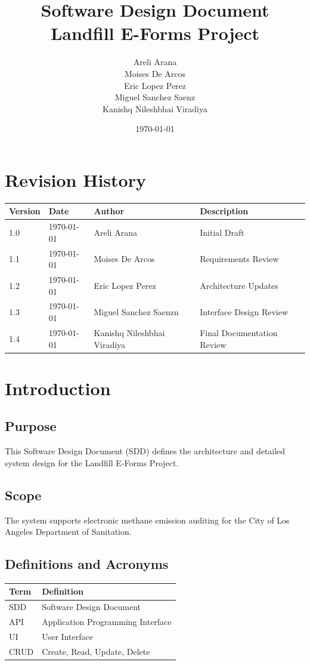 \documentclass[12pt]{article}
\title{Software Design Document\\
Landfill E-Forms Project}
\author{
Areli Arana \\
Moises De Arcos \\
Eric Lopez Perez \\
Miguel Sanchez Saenz \\
Kanishq Nileshbhai Viradiya
}
\date{\today}
\begin{document}
\maketitle
\newpage

\tableofcontents

\section*{Revision History}

\begin{longtable}{|p{2cm}|p{3cm}|p{3cm}|p{5cm}|}
\hline
Version & Date & Author & Description \\ \hline
1.0 & \today & Areli Arana & Initial Draft \\ \hline
1.1 & \today & Moises De Arcos & Requirements Review \\ \hline
1.2 & \today & Eric Lopez Perez & Architecture Updates \\ \hline
1.3 & \today & Miguel Sanchez Saenzn & Interface Design Review \\ \hline
1.4 & \today & Kanishq Nileshbhai Viradiya & Final Documentation Review  \\ \hline
\end{longtable}
\newpage

\section{Introduction}

\subsection{Purpose}

This Software Design Document (SDD) defines the architecture and detailed system design for the Landfill E-Forms Project.

\subsection{Scope}

The system supports electronic methane emission auditing for the City of Los Angeles Department of Sanitation.

\subsection{Definitions and Acronyms}

\begin{longtable}{|p{4cm}|p{8cm}|}
\hline
Term & Definition \\ \hline
SDD & Software Design Document \\ \hline
API & Application Programming Interface \\ \hline
UI & User Interface \\ \hline
CRUD & Create, Read, Update, Delete \\ \hline
\end{longtable}
\end{document}
